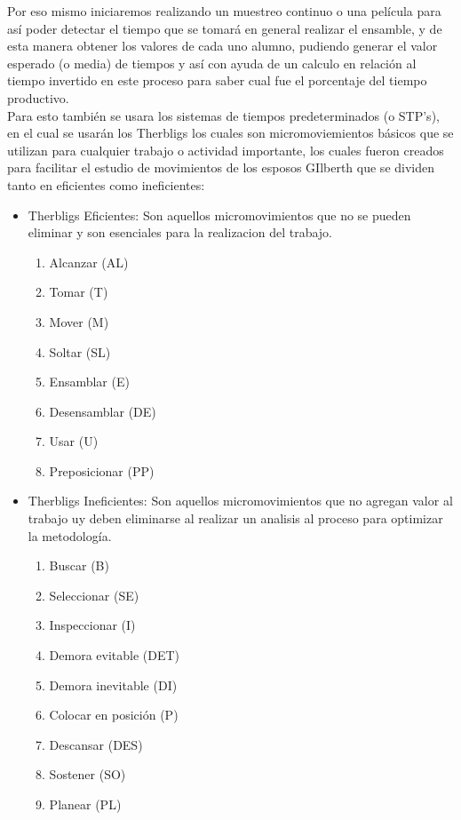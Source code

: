         Por eso mismo iniciaremos realizando un muestreo continuo o una película para así poder detectar el tiempo que se tomará en general realizar el ensamble, y de esta manera obtener los valores de cada uno alumno, pudiendo generar el valor esperado (o media) de tiempos y así con ayuda de un calculo en relación al tiempo invertido en este proceso para saber cual fue el porcentaje del tiempo productivo.
        \\Para esto también se usara los sistemas de tiempos predeterminados (o STP's), en el cual se usarán los Therbligs los cuales son micromoviemientos básicos que se utilizan para cualquier trabajo o actividad importante, los cuales fueron creados para facilitar el estudio de movimientos de los esposos GIlberth que se dividen tanto en eficientes como ineficientes:
            \begin{itemize}
        \item Therbligs Eficientes: Son aquellos micromovimientos que no se pueden eliminar y son esenciales para la realizacion del trabajo.
            \begin{enumerate}
                \item Alcanzar (AL)
                \item Tomar (T)
                \item Mover (M)
                \item Soltar (SL)
                \item Ensamblar (E)
                \item Desensamblar (DE)
                \item Usar (U)
                \item Preposicionar (PP)
            \end{enumerate}
        \item Therbligs Ineficientes: Son aquellos micromovimientos que no agregan valor al trabajo uy deben eliminarse al realizar un analisis al proceso para optimizar la metodología.
            \begin{enumerate}
                \item Buscar (B)
                \item Seleccionar (SE)
                \item Inspeccionar (I)
                \item Demora evitable (DET)
                \item Demora inevitable (DI)
                \item Colocar en posición (P)
                \item Descansar (DES)
                \item Sostener (SO)
                \item Planear (PL)
            \end{enumerate}
              \end{itemize}
              
